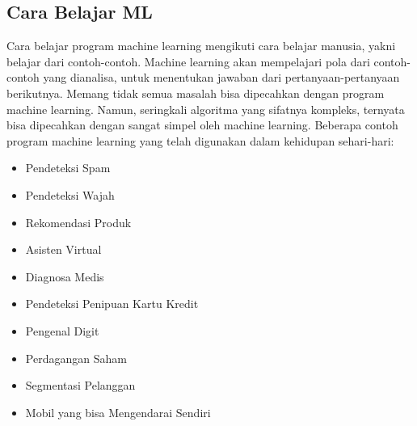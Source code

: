 \subsection{Cara Belajar ML}
Cara belajar program machine learning mengikuti cara belajar manusia, yakni belajar dari contoh-contoh. Machine learning akan mempelajari pola dari contoh-contoh yang dianalisa, untuk menentukan jawaban dari pertanyaan-pertanyaan berikutnya.
Memang tidak semua masalah bisa dipecahkan dengan program machine learning. Namun, seringkali algoritma yang sifatnya kompleks, ternyata bisa dipecahkan dengan sangat simpel oleh machine learning. Beberapa contoh program machine learning yang telah digunakan dalam kehidupan sehari-hari:
\begin{itemize}
\item Pendeteksi Spam
\item Pendeteksi Wajah
\item Rekomendasi Produk
\item Asisten Virtual
\item Diagnosa Medis
\item Pendeteksi Penipuan Kartu Kredit
\item Pengenal Digit
\item Perdagangan Saham
\item Segmentasi Pelanggan
\item Mobil yang bisa Mengendarai Sendiri
\end{itemize}
